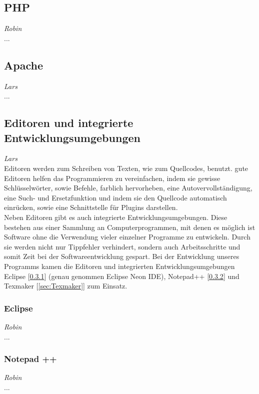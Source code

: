 \documentclass[12pt,a4paper,bibliography=totocnumbered,listof=totocnumbered]{scrartcl}
\begin{document}
\subsection{PHP}
\label{sec:PHP}
\emph{Robin}\\
...

\subsection{Apache}
\label{sec:Apache}
\emph{Lars}\\
...

\subsection{Editoren und integrierte Entwicklungsumgebungen}
\label{sec:Editoren}
\emph{Lars}\\
Editoren werden zum Schreiben von Texten, wie zum Quellcodes, benutzt. gute Editoren helfen das Programmieren zu vereinfachen, indem sie gewisse Schlüsselwörter, sowie Befehle, farblich hervorheben, eine Autovervollständigung, eine Such- und Ersetzfunktion und indem sie den Quellcode automatisch einrücken, sowie eine Schnittstelle für Plugins darstellen.\cite{Texteditor} \\
Neben Editoren gibt es auch integrierte Entwicklungsumgebungen. Diese bestehen aus einer Sammlung an Computerprogrammen, mit denen es möglich ist Software ohne die Verwendung vieler einzelner Programme zu entwickeln. Durch sie werden nicht nur Tippfehler verhindert, sondern auch Arbeitsschritte und somit Zeit bei der Softwareentwicklung gespart.\cite{Integrierte_Entwicklungsumgebung}\cite{Medienbruch}
Bei der Entwicklung unseres Programms kamen die Editoren und integrierten Entwicklungsumgebungen Eclipse [\ref{sec:Eclipse}] (genau genommen Eclipse Neon IDE), Notepad++ [\ref{sec:Notepad++}] und Texmaker [\ref{sec:Texmaker}] zum Einsatz.

\subsubsection{Eclipse}
\label{sec:Eclipse}
\emph{Robin}\\
...

\subsubsection{Notepad ++}
\label{sec:Notepad++}
\emph{Robin}\\
...
\end{document}
